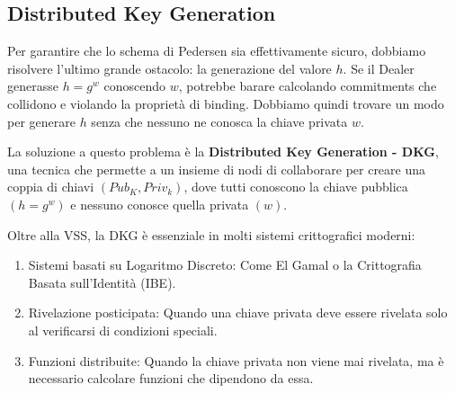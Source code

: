 \documentclass[a4paper, 11pt]{article}
\begin{document}
\begin{table}[h]
\centering
\renewcommand{\arraystretch}{1.5}
\caption{Confronto tra gli schemi di Verifiable Secret Sharing di Feldman e Pedersen.}
\end{table}

\newpage
\subsection{Distributed Key Generation}

Per garantire che lo schema di Pedersen sia effettivamente sicuro, dobbiamo risolvere l'ultimo grande ostacolo: la generazione del valore $h$. Se il Dealer generasse $h=g^w$ conoscendo $w$, potrebbe barare calcolando commitments che collidono e violando la proprietà di binding. Dobbiamo quindi trovare un modo per generare $h$ senza che nessuno ne conosca la chiave privata $w$.

La soluzione a questo problema è la \textbf{Distributed Key Generation - DKG}, una tecnica che permette a un insieme di nodi di collaborare per creare una coppia di chiavi $(Pub_K, Priv_k)$, dove tutti conoscono la chiave pubblica $(h = g^w)$ e nessuno conosce quella privata $(w)$.

Oltre alla VSS, la DKG è essenziale in molti sistemi crittografici moderni:
\begin{enumerate}
    \item Sistemi basati su Logaritmo Discreto: Come El Gamal o la Crittografia Basata sull'Identità (IBE).
    \item Rivelazione posticipata: Quando una chiave privata deve essere rivelata solo al verificarsi di condizioni speciali.
    \item Funzioni distribuite: Quando la chiave privata non viene mai rivelata, ma è necessario calcolare funzioni che dipendono da essa.
\end{enumerate}
\end{document}
